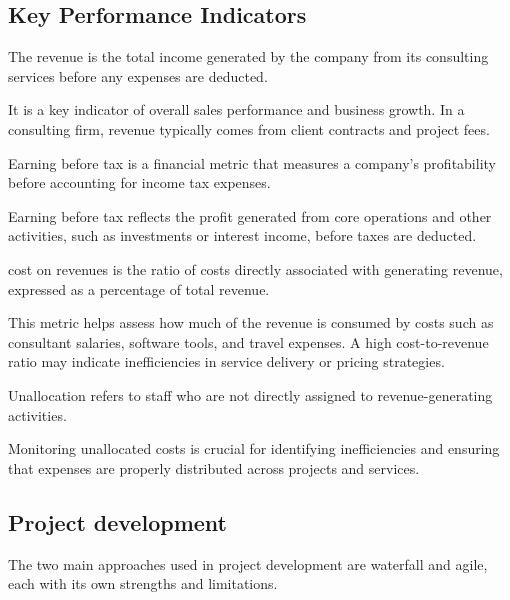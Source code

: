 \subsection{Key Performance Indicators}
\begin{definition}
    The revenue is the total income generated by the company from its consulting services before any expenses are deducted.
\end{definition}
\noindent It is a key indicator of overall sales performance and business growth. 
In a consulting firm, revenue typically comes from client contracts and project fees.

\begin{definition}
    Earning before tax is a financial metric that measures a company's profitability before accounting for income tax expenses.
\end{definition}
\noindent Earning before tax reflects the profit generated from core operations and other activities, such as investments or interest income, before taxes are deducted.

\begin{definition}
    cost on revenues is the ratio of costs directly associated with generating revenue, expressed as a percentage of total revenue.
\end{definition}
\noindent This metric helps assess how much of the revenue is consumed by costs such as consultant salaries, software tools, and travel expenses. 
A high cost-to-revenue ratio may indicate inefficiencies in service delivery or pricing strategies.

\begin{definition}
    Unallocation refers to staff who are not directly assigned to revenue-generating activities. 
\end{definition}
\noindent Monitoring unallocated costs is crucial for identifying inefficiencies and ensuring that expenses are properly distributed across projects and services.

\subsection{Project development}
The two main approaches used in project development are waterfall and agile, each with its own strengths and limitations.

